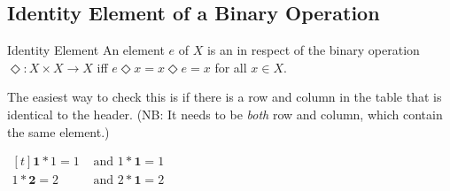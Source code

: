 \documentclass[../notes.tex]{subfiles}
\begin{document}
			\subsection{Identity Element of a Binary Operation}
				\begin{definition}{Identity Element}
					An element $e$ of $X$ is an  in respect of the binary operation $\Diamond: X \times X \rightarrow X$ iff $e \Diamond x = x \Diamond e = x$ for all $x \in X$.
				\end{definition}
				The easiest way to check this is if there is a row and column in the table that is identical to the header. (NB: It needs to be \emph{both} row and column, which contain the same element.)
				\begin{example}[hbox] $
					\begin{aligned}[t]
						\mathbf{1} * 1 = 1 &\text{ and } 1 * \mathbf{1} = 1\\
						1 * \mathbf{2} = 2 &\text{ and } 2 * \mathbf{1} = 2
					\end{aligned} $
				\end{example}
\end{document}
